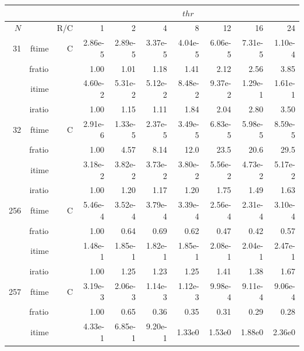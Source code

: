\documentclass[a4paper]{article}
\begin{document}
\begin{table}[htbp]
\begin{center}
\begin{small}
\begin{tabular}{|r|r|r|r|r|r|r|r|r|r|}
\hline 
     \multicolumn{3}{|c|}{ } & \multicolumn{7}{c|}{$thr$} \\ \hline
    $N$  & & R/C  & 1           & 2    & 4    & 8    & 12   & 16    & 24  \\ \hline\hline
    31  & ftime & C  &  2.86e-5 &   2.89e-5 &   3.37e-5 &   4.04e-5 &   6.06e-5 &   7.31e-5 &   1.10e-4   \\ 
      & fratio & &      1.00 &   1.01 &   1.18 &   1.41 &   2.12 &   2.56 &   3.85     \\ 
     & itime & &        4.60e-2 &   5.31e-2 &   5.12e-2 &   8.48e-2 &   9.37e-2 &   1.29e-1 &   1.61e-1     \\ 
     & iratio & &       1.00 &   1.15 &   1.11 &   1.84 &   2.04 &   2.80 &   3.50      \\ \hline 
    32  & ftime & C  &  2.91e-6 &   1.33e-5 &   2.37e-5 &   3.49e-5 &   6.83e-5 &   5.98e-5 &   8.59e-5   \\ 
      & fratio & &      1.00 &   4.57 &   8.14 &   12.0 &   23.5 &   20.6 &   29.5     \\ 
     & itime & &        3.18e-2 &   3.82e-2 &   3.73e-2 &   3.80e-2 &   5.56e-2 &   4.73e-2 &   5.17e-2     \\ 
     & iratio & &       1.00 &   1.20 &   1.17 &   1.20 &   1.75 &   1.49 &   1.63      \\ \hline 
   256  & ftime & C  &  5.46e-4 &   3.52e-4 &   3.79e-4 &   3.39e-4 &   2.56e-4 &   2.31e-4 &   3.10e-4   \\ 
      & fratio & &      1.00 &   0.64 &   0.69 &   0.62 &   0.47 &   0.42 &   0.57     \\ 
     & itime & &        1.48e-1 &   1.85e-1 &   1.82e-1 &   1.85e-1 &   2.08e-1 &   2.04e-1 &   2.47e-1     \\ 
     & iratio & &       1.00 &   1.25 &   1.23 &   1.25 &   1.41 &   1.38 &   1.67      \\ \hline 
   257  & ftime & C  &  3.19e-3 &   2.06e-3 &   1.14e-3 &   1.12e-3 &   9.98e-4 &   9.11e-4 &   9.06e-4   \\ 
      & fratio & &      1.00 &   0.65 &   0.36 &   0.35 &   0.31 &   0.29 &   0.28     \\ 
     & itime & &        4.33e-1 &   6.85e-1 &   9.20e-1 &   1.33e0 &   1.53e0 &   1.88e0 &   2.36e0     \\ 

\end{tabular}
\end{small}
\end{center}
\end{table}
\end{document}

